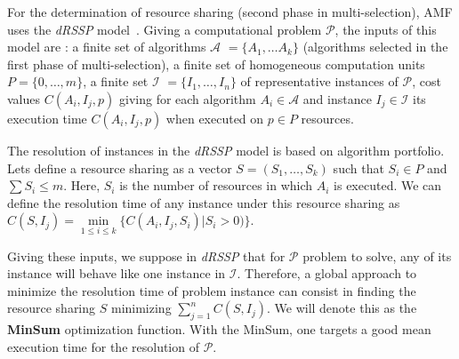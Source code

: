 For the determination of resource sharing (second phase in multi-selection), 
AMF uses the \emph{dRSSP} model~\cite{APDCM}. Giving a 
computational problem $\mathcal{P}$, the inputs of this model are : a finite set of 
algorithms $\mathcal{A}$ $= \{ A_1, \dots A_k \}$ (algorithms selected in the first phase of multi-selection), 
a finite set of homogeneous computation 
units $P = \{ 0, \dots, m \}$, a finite set $\mathcal{I}$ $= \{ I_1, \dots, I_n \}$ of representative instances 
of $\mathcal{P}$, cost values $C(A_i, I_j, p)$ giving for each algorithm 
$A_i \in \mathcal{A}$ and instance $I_j \in \mathcal{I}$ its 
execution time  $C(A_i, I_j, p)$ when executed on $p \in P$ resources.

The resolution of instances in the \emph{dRSSP} model is based on algorithm portfolio. 
Lets define a resource sharing as a vector $S = (S_1, \dots, S_k)$ such that $S_i \in P$ and 
$\sum S_i \leq m$. Here,  $S_i$ is the number of resources in which $A_i$ is executed. 
We can define the resolution time of any instance under this resource sharing 
as $C(S, I_j) = \underset{1\leq i \leq k}{\min} \{C(A_i,I_j, S_i)|S_i>0)\} $. 
\begin{table}
\centering
{}%
\qquad\qquad%
\end{table}


Giving these inputs, we suppose in \emph{dRSSP} that for $\mathcal{P}$ problem to solve, any of its 
instance will behave like one instance in $\mathcal{I}$. Therefore, a global approach to minimize the 
resolution time of problem instance can consist in finding the resource sharing $S$ minimizing $\sum_{j=1}^n C(S, I_j)$. 
We will denote this as the \textbf{MinSum} optimization function. 
With the MinSum, one targets a good mean execution time for the resolution of $\mathcal{P}$. 

